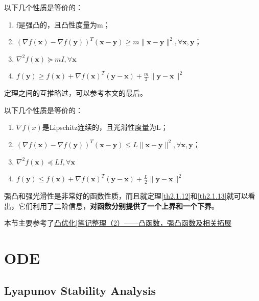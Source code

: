 \documentclass[lang=cn,10pt]{elegantbook}
\newcommand\bv[1]{\boldsymbol{#1}}
\begin{document}
\begin{theorem}
	\label{th2.1.12}
	以下几个性质是等价的：
	\begin{enumerate}[1、]
		\item f是强凸的，且凸性度量为m；
		\item $(\nabla f(\bv{x})-\nabla f(\bv{y}))^T(\bv{x-y})\geq m\|\bv{x-y}\|^2,\forall \bv{x,y}$；
		\item $\nabla^2f(\bv{x})\succeq mI,\forall \bv{x}$
		\item $f(\bv{y})\geq f(\bv{x})+\nabla f(\bv{x})^T(\bv{y-x})+\frac m2\|\bv{y-x}\|^2$
	\end{enumerate}
\end{theorem}

定理之间的互推略过，可以参考本文的最后。

\begin{theorem}
	\label{th2.1.13}
	以下几个性质是等价的：
	\begin{enumerate}[1、]
		\item $\nabla f(x)$是Lipschitz连续的，且光滑性度量为L；
		\item $(\nabla f(\bv{x})-\nabla f(\bv{y}))^T(\bv{x-y})\leq L\|\bv{x-y}\|^2,\forall \bv{x,y}$；
		\item $\nabla^2f(\bv{x})\preceq LI,\forall \bv{x}$
		\item $f(\bv{y})\leq f(\bv{x})+\nabla f(\bv{x})^T(\bv{y-x})+\frac L2\|\bv{y-x}\|^2$
	\end{enumerate}
\end{theorem}

强凸和强光滑性是非常好的函数性质，而且就定理\ref{th2.1.12}和\ref{th2.1.13}就可以看出，它们利用了二阶信息，\textbf{对函数分别提供了一个上界和一个下界}。

本节主要参考了\href{https://zhuanlan.zhihu.com/p/210252556}{凸优化|笔记整理（2）——凸函数，强凸函数及相关拓展}

\chapter{ODE}
\section{Lyapunov Stability Analysis}
\end{document}
